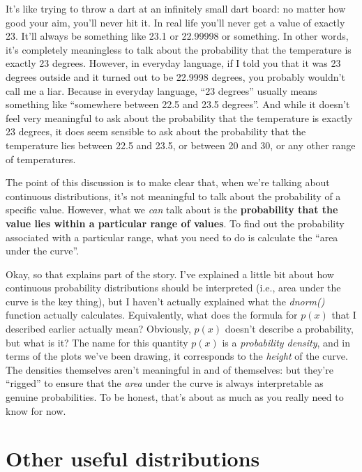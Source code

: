 \documentclass[
]{book}
\begin{document}
It's like trying to throw a dart at an infinitely small dart board: no matter how good your aim, you'll never hit it. In real life you'll never get a value of exactly 23. It'll always be something like 23.1 or 22.99998 or something. In other words, it's completely meaningless to talk about the probability that the temperature is exactly 23 degrees. However, in everyday language, if I told you that it was 23 degrees outside and it turned out to be 22.9998 degrees, you probably wouldn't call me a liar. Because in everyday language, ``23 degrees'' usually means something like ``somewhere between 22.5 and 23.5 degrees''. And while it doesn't feel very meaningful to ask about the probability that the temperature is exactly 23 degrees, it does seem sensible to ask about the probability that the temperature lies between 22.5 and 23.5, or between 20 and 30, or any other range of temperatures.

The point of this discussion is to make clear that, when we're talking about continuous distributions, it's not meaningful to talk about the probability of a specific value. However, what we \emph{can} talk about is the \textbf{probability that the value lies within a particular range of values}. To find out the probability associated with a particular range, what you need to do is calculate the ``area under the curve''.

Okay, so that explains part of the story. I've explained a little bit about how continuous probability distributions should be interpreted (i.e., area under the curve is the key thing), but I haven't actually explained what the \emph{dnorm()} function actually calculates. Equivalently, what does the formula for \(p(x)\) that I described earlier actually mean? Obviously, \(p(x)\) doesn't describe a probability, but what is it? The name for this quantity \(p(x)\) is a \emph{probability density}, and in terms of the plots we've been drawing, it corresponds to the \emph{height} of the curve. The densities themselves aren't meaningful in and of themselves: but they're ``rigged'' to ensure that the \emph{area} under the curve is always interpretable as genuine probabilities. To be honest, that's about as much as you really need to know for now.

\hypertarget{other-useful-distributions}{%
\section{Other useful distributions}\label{other-useful-distributions}}
\end{document}
